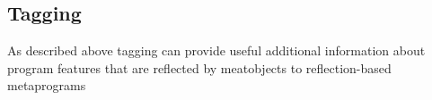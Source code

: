 \subsection{Tagging}

As described above tagging can provide useful
additional information about program features
that are reflected by meatobjects to reflection-based
metaprograms

